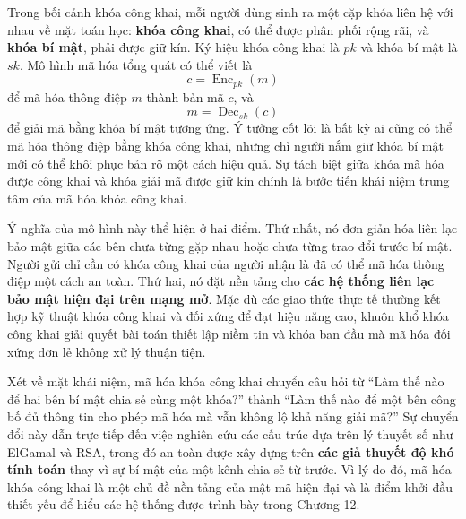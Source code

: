Trong bối cảnh khóa công khai, mỗi người dùng sinh ra một cặp khóa liên hệ với nhau về mặt toán học: \textbf{khóa công khai}, có thể được phân phối rộng rãi, và \textbf{khóa bí mật}, phải được giữ kín. Ký hiệu khóa công khai là $pk$ và khóa bí mật là $sk$. Mô hình mã hóa tổng quát có thể viết là
\[
c = \operatorname{Enc}_{pk}(m)
\]
để mã hóa thông điệp $m$ thành bản mã $c$, và
\[
m = \operatorname{Dec}_{sk}(c)
\]
để giải mã bằng khóa bí mật tương ứng. Ý tưởng cốt lõi là bất kỳ ai cũng có thể mã hóa thông điệp bằng khóa công khai, nhưng chỉ người nắm giữ khóa bí mật mới có thể khôi phục bản rõ một cách hiệu quả. Sự tách biệt giữa khóa mã hóa được công khai và khóa giải mã được giữ kín chính là bước tiến khái niệm trung tâm của mã hóa khóa công khai.

Ý nghĩa của mô hình này thể hiện ở hai điểm. Thứ nhất, nó đơn giản hóa liên lạc bảo mật giữa các bên chưa từng gặp nhau hoặc chưa từng trao đổi trước bí mật. Người gửi chỉ cần có khóa công khai của người nhận là đã có thể mã hóa thông điệp một cách an toàn. Thứ hai, nó đặt nền tảng cho \textbf{các hệ thống liên lạc bảo mật hiện đại trên mạng mở}. Mặc dù các giao thức thực tế thường kết hợp kỹ thuật khóa công khai và đối xứng để đạt hiệu năng cao, khuôn khổ khóa công khai giải quyết bài toán thiết lập niềm tin và khóa ban đầu mà mã hóa đối xứng đơn lẻ không xử lý thuận tiện.

Xét về mặt khái niệm, mã hóa khóa công khai chuyển câu hỏi từ ``Làm thế nào để hai bên bí mật chia sẻ cùng một khóa?'' thành ``Làm thế nào để một bên công bố đủ thông tin cho phép mã hóa mà vẫn không lộ khả năng giải mã?'' Sự chuyển đổi này dẫn trực tiếp đến việc nghiên cứu các cấu trúc dựa trên lý thuyết số như ElGamal và RSA, trong đó an toàn được xây dựng trên \textbf{các giả thuyết độ khó tính toán} thay vì sự bí mật của một kênh chia sẻ từ trước. Vì lý do đó, mã hóa khóa công khai là một chủ đề nền tảng của mật mã hiện đại và là điểm khởi đầu thiết yếu để hiểu các hệ thống được trình bày trong Chương 12.
